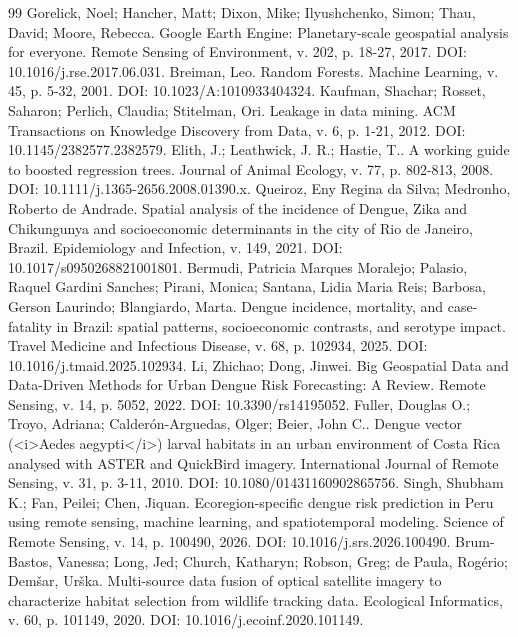 \documentclass[12pt,a4paper]{article}
\begin{document}
\begin{thebibliography}{99}
 Gorelick, Noel; Hancher, Matt; Dixon, Mike; Ilyushchenko, Simon; Thau, David; Moore, Rebecca. Google Earth Engine: Planetary-scale geospatial analysis for everyone. Remote Sensing of Environment, v. 202, p. 18-27, 2017. DOI: 10.1016/j.rse.2017.06.031.
 Breiman, Leo. Random Forests. Machine Learning, v. 45, p. 5-32, 2001. DOI: 10.1023/A:1010933404324.
 Kaufman, Shachar; Rosset, Saharon; Perlich, Claudia; Stitelman, Ori. Leakage in data mining. ACM Transactions on Knowledge Discovery from Data, v. 6, p. 1-21, 2012. DOI: 10.1145/2382577.2382579.
 Elith, J.; Leathwick, J. R.; Hastie, T.. A working guide to boosted regression trees. Journal of Animal Ecology, v. 77, p. 802-813, 2008. DOI: 10.1111/j.1365-2656.2008.01390.x.
 Queiroz, Eny Regina da Silva; Medronho, Roberto de Andrade. Spatial analysis of the incidence of Dengue, Zika and Chikungunya and socioeconomic determinants in the city of Rio de Janeiro, Brazil. Epidemiology and Infection, v. 149, 2021. DOI: 10.1017/s0950268821001801.
 Bermudi, Patricia Marques Moralejo; Palasio, Raquel Gardini Sanches; Pirani, Monica; Santana, Lidia Maria Reis; Barbosa, Gerson Laurindo; Blangiardo, Marta. Dengue incidence, mortality, and case-fatality in Brazil: spatial patterns, socioeconomic contrasts, and serotype impact. Travel Medicine and Infectious Disease, v. 68, p. 102934, 2025. DOI: 10.1016/j.tmaid.2025.102934.
 Li, Zhichao; Dong, Jinwei. Big Geospatial Data and Data-Driven Methods for Urban Dengue Risk Forecasting: A Review. Remote Sensing, v. 14, p. 5052, 2022. DOI: 10.3390/rs14195052.
 Fuller, Douglas O.; Troyo, Adriana; Calderón-Arguedas, Olger; Beier, John C.. Dengue vector (<i>Aedes aegypti</i>) larval habitats in an urban environment of Costa Rica analysed with ASTER and QuickBird imagery. International Journal of Remote Sensing, v. 31, p. 3-11, 2010. DOI: 10.1080/01431160902865756.
 Singh, Shubham K.; Fan, Peilei; Chen, Jiquan. Ecoregion-specific dengue risk prediction in Peru using remote sensing, machine learning, and spatiotemporal modeling. Science of Remote Sensing, v. 14, p. 100490, 2026. DOI: 10.1016/j.srs.2026.100490.
 Brum-Bastos, Vanessa; Long, Jed; Church, Katharyn; Robson, Greg; de Paula, Rogério; Demšar, Urška. Multi-source data fusion of optical satellite imagery to characterize habitat selection from wildlife tracking data. Ecological Informatics, v. 60, p. 101149, 2020. DOI: 10.1016/j.ecoinf.2020.101149.

\end{thebibliography}
\end{document}

